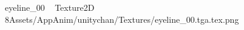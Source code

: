 
   eyeline_00             	   Texture2D
   8   Assets/AppAnim/unitychan/Textures/eyeline_00.tga.tex.png